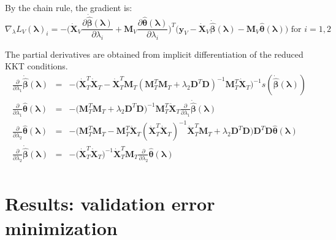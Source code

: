 \documentclass[10pt,letterpaper]{article}
\begin{document}
By the chain rule, the gradient is:
\begin{equation}
\nabla_\lambda L_V(\boldsymbol{\lambda})_i =
- \bigg(
\dot{\boldsymbol{X}}_V \frac{\partial \dot{\hat{\boldsymbol{\beta}}}(\boldsymbol{\lambda})}{\partial \lambda_i}
+ \boldsymbol{M}_V \frac{\partial \hat{\boldsymbol{\theta}}(\boldsymbol{\lambda})}{\partial \lambda_i}
\bigg )^T
\bigg (
\boldsymbol{y}_V
- \dot{\boldsymbol{X}}_V \dot{\hat{\boldsymbol{\beta}}}(\boldsymbol{\lambda})
- \boldsymbol{M}_V\hat{\boldsymbol{\theta}}(\boldsymbol{\lambda})
\bigg )
\text{ for } i = 1,2 
\end{equation}

The partial derivatives are obtained from implicit differentiation of the reduced KKT conditions.
\begin{equation}
\begin{array}{lcl}
\frac{\partial}{\partial \lambda_1} \dot{\hat{\boldsymbol{\beta}}}(\boldsymbol{\lambda})  &=&
-\bigg(\dot{\boldsymbol{X}}_T^T \dot{\boldsymbol{X}}_T
- \dot{\boldsymbol{X}}_T^T \boldsymbol{M}_T(\boldsymbol{M}_T^T \boldsymbol{M}_T
+ \lambda_2 \boldsymbol{D}^T\boldsymbol{D})^{-1} \boldsymbol{M}_T^T \dot{\boldsymbol{X}}_T \bigg)^{-1} 
s( \dot{\hat{\boldsymbol{\beta}}}(\boldsymbol{\lambda})) \\
\frac{\partial }{\partial \lambda_1} \hat{\boldsymbol{\theta}}(\boldsymbol{\lambda}) &=&
-\bigg(\boldsymbol{M}_T^T \boldsymbol{M}_T
+ \lambda_2 \boldsymbol{D}^T \boldsymbol{D}\bigg)^{-1}
\boldsymbol{M}_T^T \dot{\boldsymbol{X}}_T \frac{\partial}{\partial \lambda_1} \dot{\hat{\boldsymbol{\beta}}}(\boldsymbol{\lambda})
\\
\frac{\partial}{\partial \lambda_2}  \hat{\boldsymbol{\theta}}(\boldsymbol{\lambda}) &=&
-\bigg(\boldsymbol{M}_T^T \boldsymbol{M}_T
- \boldsymbol{M}_T^T \dot{\boldsymbol{X}}_T (\dot{\boldsymbol{X}}_T^T\dot{\boldsymbol{X}}_T)^{-1} \dot{\boldsymbol{X}}_T^T \boldsymbol{M}_T + \lambda_2 \boldsymbol{D}^T\boldsymbol{D} \bigg)
\boldsymbol{D}^T\boldsymbol{D} \hat{\boldsymbol{\theta}}(\boldsymbol{\lambda})
\\
\frac{\partial}{\partial \lambda_2} \dot{\hat{\boldsymbol{\beta}}}(\boldsymbol{\lambda}) &=&
- \bigg( \dot{\boldsymbol{X}}_T^T\dot{\boldsymbol{X}}_T\bigg)^{-1}
\dot{\boldsymbol{X}}_T^T \boldsymbol{M}_T
\frac{\partial}{\partial \lambda_2}  \hat{\boldsymbol{\theta}}(\boldsymbol{\lambda})\\
\end{array}
\end{equation}


\section{Results: validation error minimization}
\end{document}
